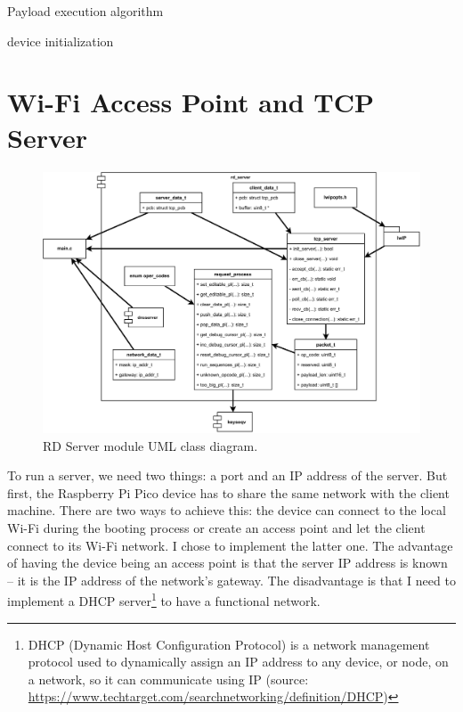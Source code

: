 \begin{algorithm}
\caption{Payload execution algorithm}
\label{alg:payload_exec}
\BlankLine
device initialization\;
\end{algorithm}

\section{Wi-Fi Access Point and TCP Server}
\begin{figure}[ht]
    \centering
    \includegraphics[width=\linewidth]{./obrazky-figures/rd_server_module.pdf}
    \caption{RD Server module UML class diagram.}
    \label{fig:rd_server_module}
\end{figure}
To run a server, we need two things: a port and an IP address of the server. But first, the Raspberry Pi Pico device has to share the same network with the client machine. There are two ways to achieve this: the device can connect to the local Wi-Fi during the booting process or create an access point and let the client connect to its Wi-Fi network. I chose to implement the latter one. The advantage of having the device being an access point is that the server IP address is known \--- it is the IP address of the network's gateway. The disadvantage is that I need to implement a DHCP server\footnote{DHCP (Dynamic Host Configuration Protocol) is a network management protocol used to dynamically assign an IP address to any device, or node, on a network, so it can communicate using IP (source: \url{https://www.techtarget.com/searchnetworking/definition/DHCP})} to have a functional network.

